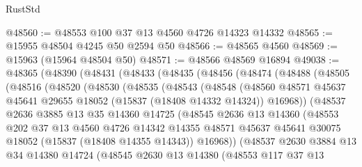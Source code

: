\begin{lexlean}{RustStd}
\begin{coremodule}
@48560 := @48553 @100 @37 @13 @4560 @4726 @14323 @14332
@48565 := @15955 @48504 @4245 @50 @2594 @50
@48566 := @48565 @4560
@48569 := @15963 (@15964 @48504 @50)
@48571 := @48566 @48569 @16894
@49038 := @48365
    (@48390
      (@48431
        (@48433
          (@48435
            (@48456
              (@48474
                (@48488
                  (@48505
                    (@48516
                      (@48520
                        (@48530
                          (@48535
                            (@48543
                              (@48548
                                (@48560
                                  @48571
                                  @45637
                                  @45641
                                  @29655
                                  @18052
                                  (@15837 (@18408 @14332 @14324))
                                  @16968))
                              (@48537
                                @2636
                                @3885
                                @13
                                @35
                                @14360
                                @14725
                                (@48545
                                  @2636
                                  @13
                                  @14360
                                  (@48553
                                    @202
                                    @37
                                    @13
                                    @4560
                                    @4726
                                    @14342
                                    @14355
                                    @48571
                                    @45637
                                    @45641
                                    @30075
                                    @18052
                                    (@15837 (@18408 @14355 @14343))
                                    @16968))
                                (@48537
                                  @2630
                                  @3884
                                  @13
                                  @34
                                  @14380
                                  @14724
                                  (@48545
                                    @2630
                                    @13
                                    @14380
                                    (@48553
                                      @117
                                      @37
                                      @13

\end{coremodule}
\end{lexlean}
